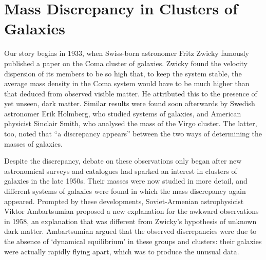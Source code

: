 \documentclass{naturefig}
\begin{document}
\vspace{8pt}

\section*{Mass Discrepancy in Clusters of Galaxies}

Our story begins in 1933, when Swiss-born astronomer Fritz Zwicky famously published a paper on the Coma cluster of galaxies.\cite{Zwicky1933} Zwicky found the velocity dispersion of its members to be so high that, to keep the system stable, the average mass density in the Coma system would have to be much higher than that deduced from observed visible matter. He attributed this to the presence of yet unseen, dark matter. Similar results were found soon afterwards by Swedish astronomer Erik Holmberg, who studied systems of galaxies, and American physicist Sinclair Smith, who analysed the mass of the Virgo cluster.\cite{Holmberg1937,Smith1936a} The latter, too, noted that ``a discrepancy appears'' %
between the two ways of determining the masses of galaxies.

Despite the discrepancy, debate on these observations only began after new astronomical surveys and catalogues had sparked an interest in clusters of galaxies in the late 1950s.\cite{Zwicky1956a,Shane1956,Abell1957,Abell1959} Their masses were now studied in more detail, and different systems of galaxies were found in which the mass discrepancy again appeared.\cite{Kahn1959,Page1959} Prompted by these developments, Soviet-Armenian astrophysicist Viktor Ambartsumian proposed a new explanation for the awkward observations in 1958, an explanation that was different from Zwicky's hypothesis of unknown dark matter. Ambartsumian argued that the observed discrepancies were due to the absence of `dynamical equilibrium' in these groups and clusters: their galaxies were actually rapidly flying apart, which was to produce the unusual data.\cite{Ambartsumian1958a}
\end{document}
